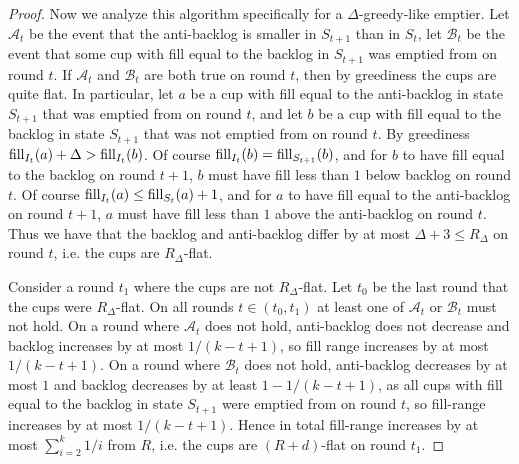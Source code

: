 \begin{proof}
  Now we analyze this algorithm specifically for a
  $\Delta$-greedy-like emptier. 
  Let $\mathcal{A}_t$ be the event that the
  anti-backlog is smaller in $S_{t+1}$ than in $S_t$, let
  $\mathcal{B}_t$ be the event that some cup with fill equal to
  the backlog in $S_{t+1}$ was emptied from on round $t$. If
  $\mathcal{A}_t$ and $\mathcal{B}_t$ are both true on round $t$,
  then by greediness the cups are quite flat. In particular, 
  let $a$ be a cup with fill equal to the anti-backlog in state
  $S_{t+1}$ that was emptied from on round $t$, and let $b$ be
  a cup with fill equal to the backlog in state $S_{t+1}$ that
  was not emptied from on round $t$. By greediness $\operatorname{\text{\textup{fill}}}_{I_t}(a) + \Delta
  > \operatorname{\text{\textup{fill}}}_{I_t}(b)$. Of course $\operatorname{\text{\textup{fill}}}_{I_t}(b) =
  \operatorname{\text{\textup{fill}}}_{S_{t+1}}(b)$, and for $b$ to have fill equal to the backlog
  on round $t+1$, $b$ must have fill less than $1$ below 
  backlog on round $t$. Of course $\operatorname{\text{\textup{fill}}}_{I_t}(a) \le
  \operatorname{\text{\textup{fill}}}_{S_t}(a) + 1$, and for $a$ to have fill equal to the
  anti-backlog on round $t+1$, $a$ must have fill less than $1$
  above the anti-backlog on round $t$. Thus we have that the
  backlog and anti-backlog differ by at most $\Delta + 3 \le
  R_\Delta$ on round $t$, i.e. the cups are $R_\Delta$-flat.

  Consider a round $t_1$ where the cups are not $R_\Delta$-flat.
  Let $t_0$ be the last round that the cups were $R_\Delta$-flat.
  On all rounds $t \in (t_0, t_1)$ at least one of
  $\mathcal{A}_t$ or $\mathcal{B}_t$ must not hold. On a round
  where $\mathcal{A}_t$ does not hold, anti-backlog does not
  decrease and backlog increases by at most $1/(k-t+1)$, so fill
  range increases by at most $1/(k-t+1).$ On a round where
  $\mathcal{B}_t$ does not hold, anti-backlog decreases by at
  most $1$ and backlog decreases by at least $1-1/(k-t+1)$, as
  all cups with fill equal to the backlog in state $S_{t+1}$ were
  emptied from on round $t$, so fill-range increases by at most
  $1/(k-t+1)$. 
  Hence in total fill-range increases by at most $\sum_{i=2}^k
  1/i$ from $R$, i.e. the cups are $(R+d)$-flat on round $t_1$.

\end{proof}
